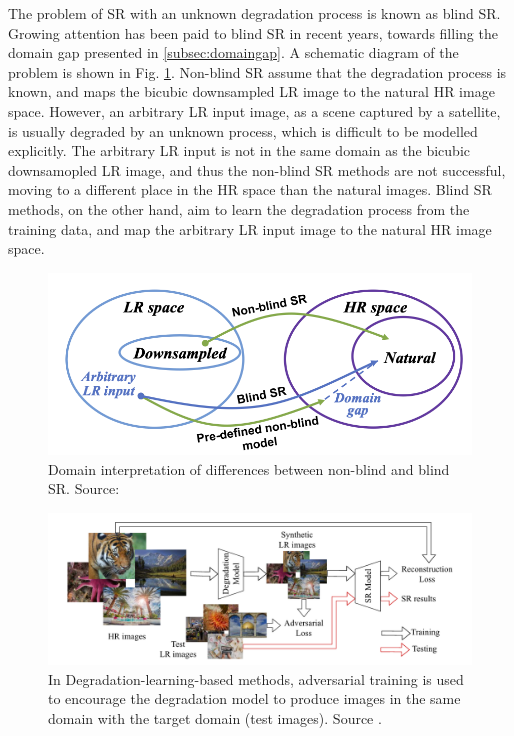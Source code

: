         The problem of SR with an unknown degradation process is known as blind SR. 
        Growing attention has been paid to blind SR in recent years, towards filling the domain gap presented in \ref{subsec:domaingap}.
        A schematic diagram of the problem is shown in Fig. \ref{fig:2-DomainGap}. 
        Non-blind SR assume that the degradation process is known, and maps the bicubic downsampled LR image to the natural HR image space.
        However, an arbitrary LR input image, as a scene captured by a satellite, is usually degraded by an unknown process, which is difficult to be modelled explicitly.
        The arbitrary LR input is not in the same domain as the bicubic downsamopled LR image, and thus the non-blind SR methods are not successful, moving to a different place in the HR space than the natural images.
        Blind SR methods, on the other hand, aim to learn the degradation process from the training data, and map the arbitrary LR input image to the natural HR image space.

        \begin{figure}[H]
            \centering
            \includegraphics[scale=0.45]{Includes/2-DomainGap.png}
            \caption{Domain interpretation of differences between non-blind and blind SR. Source: \cite{liu2021blind}}
            \label{fig:2-DomainGap}
        \end{figure}


        \begin{figure}[H]
            \centering
            \includegraphics[scale=0.65]{Includes/3-GAN-degradation-model.png}
            \caption{In Degradation-learning-based methods, 
                     adversarial training is used to encourage the degradation model to produce images in the same domain with the target domain (test images).
                     Source \cite{luo2022learning}.}
            \label{fig:3-GAN-degradation-model}
        \end{figure}

        

\clearpage